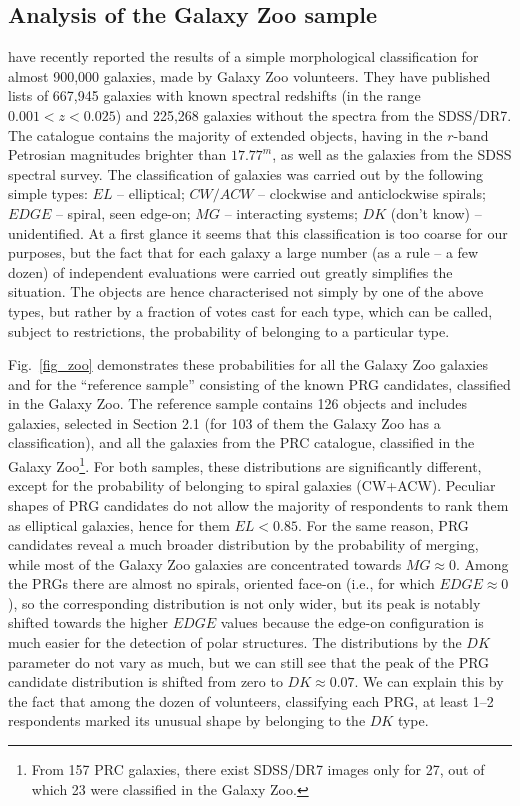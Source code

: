 \documentclass[useAMS,usenatbib]{mn2e}
\begin{document}
\subsection{Analysis of the Galaxy Zoo sample}

\label{sect_zoo}

\citet{GalZoo2011} have recently reported the results of a simple
morphological classification for almost 900,000 galaxies, made by
Galaxy Zoo volunteers. They have published lists of 667,945
galaxies with known spectral redshifts  (in the range $0.001<z<0.025$) and 225,268 galaxies
without the spectra from the SDSS/DR7. The catalogue contains  the majority  of
extended objects, having in the $r$-band Petrosian magnitudes
brighter than  $17.77^m$, as well as the
galaxies from the SDSS spectral survey. The classification of
galaxies was carried out by the following simple types: $EL$ --
elliptical; $CW/ACW$ -- clockwise and anticlockwise spirals;
$EDGE$ -- spiral, seen edge-on; $MG$ -- interacting
systems; $DK$ (don't know) -- unidentified. At a first glance it
seems that this classification is too coarse for our purposes, but
the fact that for each galaxy a large number (as a rule -- a few
dozen) of independent evaluations were carried out greatly
simplifies the situation.  The objects are hence characterised not
simply by one of the above types, but rather by a fraction of
votes cast for each type, which can be called, subject to
restrictions, the probability of belonging to a particular type.

Fig.~\ref{fig_zoo} demonstrates these probabilities for all the
Galaxy Zoo galaxies and for the ``reference sample'' consisting of
the known PRG candidates, classified in the Galaxy Zoo. The
reference sample contains 126 objects and includes galaxies,
selected in Section 2.1 (for 103 of them the Galaxy Zoo has a
classification), and all the galaxies from the PRC catalogue,
classified in the Galaxy Zoo\footnote{From 157 PRC galaxies, there
exist SDSS/DR7 images only for 27, out of which 23 were classified
in the Galaxy Zoo.}. For both samples, these distributions are
significantly different, except for the probability of belonging
to spiral galaxies (CW+ACW). Peculiar shapes of PRG candidates do
not allow the majority of respondents to rank them as elliptical
galaxies, hence for them $EL<0.85$. For the same reason, PRG
candidates reveal a much broader distribution by the probability
of merging, while most of the Galaxy Zoo galaxies are concentrated
towards $MG\approx0$. Among the PRGs there are almost no spirals,
oriented face-on (i.e., for which $EDGE\approx0$), so the
corresponding distribution is not only wider, but its peak is
notably shifted towards the higher $EDGE$ values  because the edge-on configuration is much easier for the detection of polar structures. The
distributions by the $DK$ parameter do not vary as much, but we can
still see that the peak of the PRG candidate distribution is
shifted from zero to $DK\approx0.07$. We can explain this by the
fact that among the dozen of volunteers, classifying each PRG, at
least 1--2 respondents marked its unusual shape by belonging to
the $DK$ type.
\end{document}
